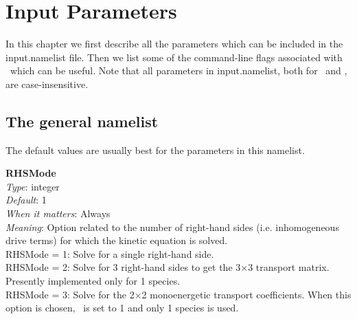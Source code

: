 \chapter{Input Parameters}
\label{ch:input}

\newcommand{\param}[5]{{\setlength{\parindent}{0cm} {\ttfamily \bfseries \hypertarget{#1}{#1}}\\{\it Type}: #2\\{\it Default}: #3\\{\it When it matters}: #4\\{\it Meaning}: #5}}
\newcommand{\ssparam}[4]{{\setlength{\parindent}{0cm} {\ttfamily \bfseries \hypertarget{#1}{#1}}\\{\it Type}: #2\\{\it When it matters}: #3\\{\it Meaning}: #4}}
\newcommand{\PETScParam}[2]{{\setlength{\parindent}{0cm} {\ttfamily \bfseries #1}\\{\it Meaning}: #2}}
\newcommand{\myhrule}{{\setlength{\parindent}{0cm} \hrulefill }}

\newcommand{\true}{{\ttfamily .true.}}
\newcommand{\false}{{\ttfamily .false.}}

In this chapter we first describe all the parameters which can be included in the {\ttfamily input.namelist} file. 
Then we list some of the command-line flags associated with \PETSc~which can be useful.
Note that all parameters in {\ttfamily input.namelist}, both for \sfincs~and \sfincsScan,
are case-insensitive.




\section{The {\ttfamily general} namelist}

The default values are usually best for the parameters in this namelist.

\myhrule

\param{RHSMode}
{integer}
{1}
{Always}
{Option related to the number of right-hand sides (i.e. inhomogeneous drive terms) for which the kinetic equation is solved.\\

{\ttfamily RHSMode} = 1: Solve for a single right-hand side.\\

{\ttfamily RHSMode} = 2: Solve for 3 right-hand sides to get the 3$\times$3 transport matrix. Presently implemented only for 1 species.\\

{\ttfamily RHSMode} = 3: Solve for the 2$\times$2 monoenergetic transport coefficients. When this option is chosen, \Nx~is set to 1 and only 1 species is used.
}

